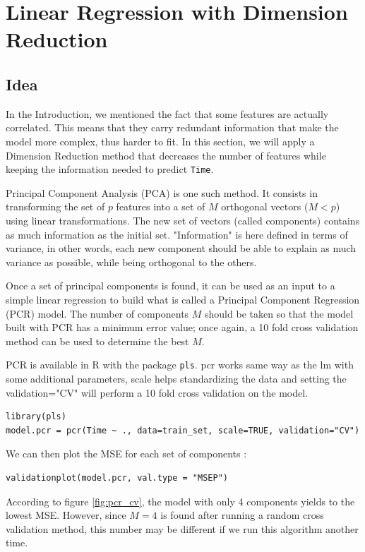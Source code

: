 \documentclass[]{report}
\begin{document}
\section{Linear Regression with Dimension Reduction}
\subsection{Idea}
In the Introduction, we mentioned the fact that some features are actually correlated. This means that they carry redundant information that make the model more complex, thus harder to fit. In this section, we will apply a Dimension Reduction method that decreases the number of features while keeping the information needed to predict \texttt{Time}.

Principal Component Analysis (PCA) is one such method. It consists in transforming the set of $p$ features into a set of $M$ orthogonal vectors ($M < p$) using linear transformations. The new set of vectors (called components) contains as much information as the initial set. "Information" is here defined in terms of variance, in other words, each new component should be able to explain as much variance as possible, while being orthogonal to the others.

Once a set of principal components is found, it can be used as an input to a simple linear regression to build what is called a Principal Component Regression (PCR) model. The number of components $M$ should be taken so that the model built with PCR has a minimum error value; once again, a 10 fold cross validation method can be used to determine the best $M$.

PCR is available in R with the package \texttt{pls}. pcr works same way as the lm with some additional parameters, scale helps standardizing the data and setting the validation="CV" will perform a 10 fold cross validation on the model.
\begin{lstlisting}
library(pls)
model.pcr = pcr(Time ~ ., data=train_set, scale=TRUE, validation="CV")
\end{lstlisting}

We can then plot the MSE for each set of components :
\begin{lstlisting}
validationplot(model.pcr, val.type = "MSEP")
\end{lstlisting}

According to figure \ref{fig:pcr_cv}, the model with only 4 components yields to the lowest MSE. However, since $M = 4$ is found after running a random cross validation method, this number may be different if we run this algorithm another time.
\end{document}
